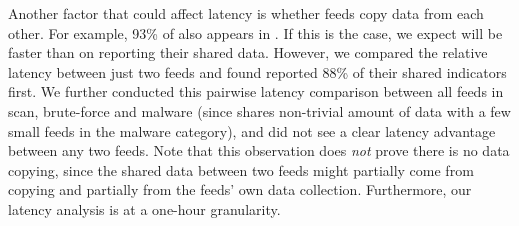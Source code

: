 
Another factor that could affect latency is whether feeds copy data from each other. For example, 93\% of {\feeddangerrule} also appears in {\feedbadipssh}. If this is the case, we expect {\feeddangerrule} will be faster than {\feedbadipssh} on
reporting their shared data. However, we compared the relative latency between just two feeds and found {\feedbadipssh} reported 88\% of their shared indicators first.
We further conducted this pairwise latency comparison between all feeds in scan, brute-force
and malware (since {\feedetiprep} shares non-trivial amount of data with a
few small feeds in the malware category), and did not see a clear latency advantage between
any two feeds. Note that this observation does \emph{not} prove there is no data
copying, since the shared data between two feeds might partially come from copying and partially from the feeds' own data collection. Furthermore, our latency analysis is at a one-hour granularity.
